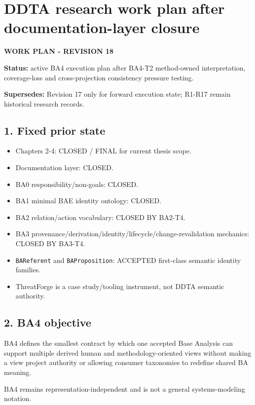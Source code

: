 \documentclass[11pt,a4paper]{article}
\providecommand{\tightlist}{\setlength{\itemsep}{0pt}\setlength{\parskip}{0pt}}
\begin{document}
\section{DDTA research work plan after documentation-layer
closure}\label{ddta-research-work-plan-after-documentation-layer-closure}

\textbf{WORK PLAN - REVISION 18}

\textbf{Status:} active BA4 execution plan after BA4-T2 method-owned
interpretation, coverage-loss and cross-projection consistency pressure
testing.

\textbf{Supersedes:} Revision 17 only for forward execution state;
R1-R17 remain historical research records.

\subsection{1. Fixed prior state}\label{1-fixed-prior-state}

\begin{itemize}
\tightlist
\item
  Chapters 2-4: CLOSED / FINAL for current thesis scope.
\item
  Documentation layer: CLOSED.
\item
  BA0 responsibility/non-goals: CLOSED.
\item
  BA1 minimal BAE identity ontology: CLOSED.
\item
  BA2 relation/action vocabulary: CLOSED BY BA2-T4.
\item
  BA3 provenance/derivation/identity/lifecycle/change-revalidation
  mechanics: CLOSED BY BA3-T4.
\item
  \texttt{BAReferent} and \texttt{BAProposition}: ACCEPTED first-class
  semantic identity families.
\item
  ThreatForge is a case study/tooling instrument, not DDTA semantic
  authority.
\end{itemize}

\subsection{2. BA4 objective}\label{2-ba4-objective}

BA4 defines the smallest contract by which one accepted Base Analysis
can support multiple derived human and methodology-oriented views
without making a view project authority or allowing consumer taxonomies
to redefine shared BA meaning.

BA4 remains representation-independent and is not a general
systems-modeling notation.
\end{document}
